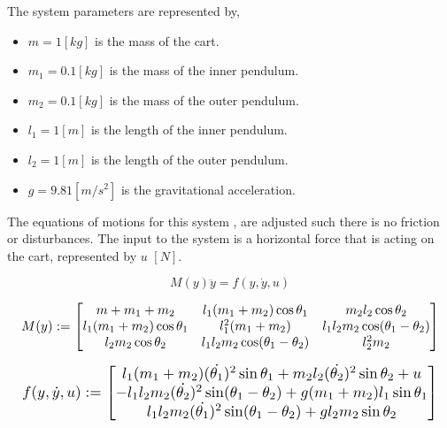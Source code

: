 \documentclass{LTHtwocol} %
\begin{document}
The system parameters are represented by,
\begin{itemize}
\item $m = 1 [kg]$ is the mass of the cart.
\item $m_1 = 0.1 [kg]$ is the mass of the inner pendulum.
\item $m_2 = 0.1[kg]$ is the mass of the outer pendulum.
\item $l_1 = 1 [m]$ is the length of the inner pendulum.
\item $l_2 = 1[m]$ is the length of the outer pendulum.
\item $g = 9.81 [m/s^2]$ is the gravitational acceleration.
 \end{itemize}

The equations of motions for this system \cite{Double_Pendulum_Equations}, are adjusted such there is no friction or disturbances.
The input to the system is a horizontal force that is acting on the cart, represented by $u$ $[N]$.

\begin{equation}
M(y) \ddot{y} = f(y,\dot{y},u)
\end{equation}


\begin{equation}
\resizebox{ \columnwidth}{!}
{
$
M(y) :=
\begin{bmatrix}
m + m_1 +m_2 & l_1(m_1+m_2)\cos \theta_1 & m_2 l_2 \cos \theta_2 \\
l_1 (m_1 + m_2) \cos \theta_1 & l_1^2(m_1+m_2) & l_1 l_2 m_2 \cos(\theta_1 - \theta_2) \\
l_2 m_2 \cos \theta_2 & l_1 l_2 m_2 \cos (\theta_1 - \theta_2) & l_2^2 m_2
\end{bmatrix}
$
}
\end{equation}

\begin{equation}
\resizebox{ \columnwidth}{!}
{
$
f(y,\dot{y},u) :=
\begin{bmatrix}
l_1(m_1+m_2) (\dot{\theta_1})^2 \sin \theta_1 + m_2 l_2 (\dot{\theta_2})^2 \sin \theta_2 + u\\
-l_1l_2m_2(\dot{\theta_2})^2 \sin(\theta_1 - \theta_2) + g(m_1 + m_2)l_1 \sin \theta_1 \\
l_1l_2m_2(\dot{\theta_1})^2 \sin (\theta_1 - \theta_2) + g l_2 m_2 \sin \theta_2
\end{bmatrix}
 $
 }
\end{equation}
\end{document}
